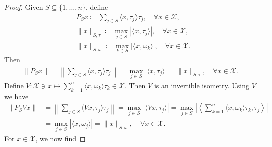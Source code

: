 \documentclass{amsart}
\begin{document}
\begin{proof}
Given $S\subseteq \{1, \dots, n\}$, define 
\begin{align*}
	&P_Sx\coloneqq \sum_{j\in S}\langle x, \tau_j\rangle\tau_j, \quad \forall x \in \mathcal{X},\\
	&\|x\|_{S, \tau}\coloneqq \displaystyle \max_{j \in S}|\langle x, \tau_j\rangle|, \quad \forall x \in \mathcal{X},\\
	&\|x\|_{S, \omega}\coloneqq \displaystyle \max_{k \in S}|\langle x, \omega_k\rangle|, \quad \forall x \in \mathcal{X}.
\end{align*}
Then 
\begin{align*}
	\|P_Sx\|=\left\|\sum_{j\in S}\langle x, \tau_j \rangle \tau_j\right\|=\displaystyle \max_{j \in S}|\langle x, \tau_j\rangle|=\|x\|_{S, \tau}, \quad \forall x \in \mathcal{X}.
\end{align*}
Define $V:\mathcal{X}\ni x \mapsto \sum_{k=1}^{n}\langle x, \omega_k\rangle\tau_k \in \mathcal{X}$. Then $V$ is an invertible isometry. Using $V$ we have
\begin{align*}
	\|P_SVx\|&=\left\|\sum_{j\in S}\langle Vx, \tau_j\rangle \tau_j\right\|=\displaystyle \max_{j \in S}|\langle Vx, \tau_j\rangle|=\displaystyle \max_{j \in S}\left|\left\langle \sum_{k=1}^{n}\langle x, \omega_k\rangle\tau_k, \tau_j\right\rangle\right|\\
	&=\displaystyle \max_{j \in S}|\langle x, \omega_j\rangle|=\|x\|_{S, \omega}, \quad \forall x \in \mathcal{X}.
\end{align*}
For $x \in \mathcal{X}$, we  now find 


\end{proof}
\end{document}
